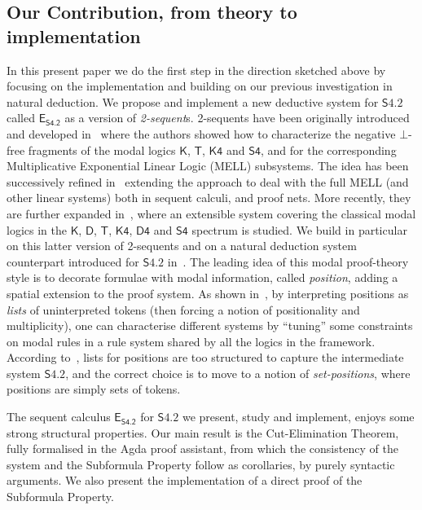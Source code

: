 \documentclass{article}
\newcommand{\logic}{\mathsf{S4.2}}
\newcommand{\axname}[1]{\mathsf{#1}}
\newcommand{\eseq}{\mathsf{E}_{{\textsf{S4.2}}}}
\newcommand{\agda}{\textsf{Agda}}
\theoremstyle{definition}
\begin{document}
\subsection{Our Contribution, from theory to implementation}
In this present paper we do the first step in the direction sketched above by focusing on the implementation and building on our previous investigation in natural deduction. We propose and implement a new deductive system for $\logic$ called $\eseq$ as a version of \emph{2-sequent}s. 2-sequents have been originally introduced and developed in~\cite{Masini1992:TwoSequentModalities, Masini1993:TwoSequentIntuitionism,MM:ONFineStr:95,MM:ComInt:95} where the authors showed how to characterize the negative $\bot$-free fragments of the modal logics $\axname{K}$, $\axname{T}$, $\axname{K4}$ and $\axname{S4}$, and for the corresponding Multiplicative Exponential Linear Logic (MELL) subsystems. The idea has been successively refined in~\cite{GMM:an-exp-ext-seq,GueMarMasPNGC2001} extending the approach to deal with the full MELL (and other linear systems) both in sequent calculi, and proof nets. More recently, they are further expanded in~\cite{Martini2023:CutElimination}, where an extensible system covering the classical modal logics in the $\axname{K}$, $\axname{D}$, $\axname{T}$, $\axname{K4}$, $\axname{D4}$ and $\axname{S4}$ spectrum is studied. We build in particular on this latter version of 2-sequents and on a natural deduction system counterpart introduced for $\logic$ in~\cite{Martini2024:S42NaturalDeduction}.
The leading idea of this modal  proof-theory style is to decorate formulae with modal information, called \emph{position}, adding a spatial extension to the proof system.
As shown in~\cite{Martini2023:CutElimination}, by interpreting positions as \emph{lists} of uninterpreted tokens (then forcing a notion of positionality and multiplicity), one can characterise different systems by ``tuning'' some constraints on modal rules in a rule system shared by all the logics in the framework. According to~\cite{Martini2024:S42NaturalDeduction}, lists for positions are too structured to capture the intermediate system $\logic$, and the correct choice is to move to a notion of \emph{set-positions}, where positions are simply sets of tokens.

The sequent calculus $\eseq$ for $\logic$ we present, study and implement, enjoys some strong structural properties. Our main result is the Cut-Elimination Theorem, fully formalised in the \agda{} proof assistant, from which the consistency of the system and the Subformula Property follow as corollaries, by purely syntactic arguments. We also present the implementation of a direct proof of the Subformula Property.%
\end{document}
